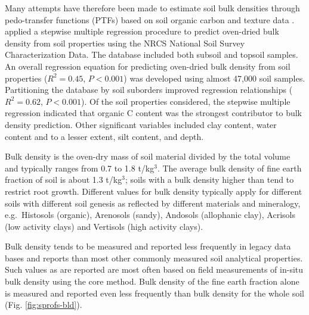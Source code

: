 \documentclass[graybox,natbib,nospthms,UStrade]{svmono}
\let\BeginKnitrBlock\begin \let\EndKnitrBlock\end
\let\BeginKnitrBlock\begin \let\EndKnitrBlock\end
\begin{document}
Many attempts have therefore been made to estimate soil bulk densities
through pedo-transfer functions (PTFs) based on soil organic carbon and
texture data
\citep{Curtis1964SSSAP, Adams1973JSS, Alexander1980SSSAJ, Federer1993CJFR, Rawls1983SS, Manrique1991SSSAJ, Bernoux1998SSSAJ}.
\citet{Heuscher2005SSSAJ} applied a stepwise multiple regression procedure to
predict oven-dried bulk density from soil properties using the NRCS
National Soil Survey Characterization Data. The database included both
subsoil and topsoil samples. An overall regression equation for
predicting oven-dried bulk density from soil properties (\(R^2=0.45\),
\(P<0.001\)) was developed using almost 47,000 soil samples. Partitioning
the database by soil suborders improved regression relationships
(\(R^2=0.62\), \(P<0.001\)). Of the soil properties considered, the stepwise
multiple regression indicated that organic C content was the strongest
contributor to bulk density prediction. Other significant variables
included clay content, water content and to a lesser extent, silt
content, and depth.

\BeginKnitrBlock{rmdnote}
Bulk density is the oven-dry mass of soil material divided by the total
volume and typically ranges from 0.7 to 1.8 t/kg\(^3\). The average bulk density of
fine earth fraction of soil is about 1.3 t/kg\(^3\); soils with a bulk density higher
than tend to restrict root growth. Different values for bulk density
typically apply for different soils with different soil genesis as
reflected by different materials and mineralogy, e.g.~Histosols
(organic), Arenosols (sandy), Andosols (allophanic clay), Acrisols (low
activity clays) and Vertisols (high activity clays).
\EndKnitrBlock{rmdnote}

Bulk density tends to be measured and reported less frequently in legacy
data bases and reports than most other commonly measured soil analytical
properties. Such values as are reported are most often based on field
measurements of in-situ bulk density using the core method. Bulk density
of the fine earth fraction alone is measured and reported even less
frequently than bulk density for the whole soil
(Fig. \ref{fig:sprofs-bld}).
\end{document}
